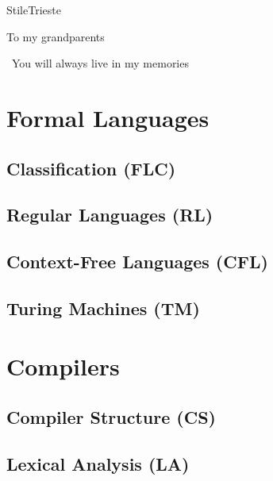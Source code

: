 \documentclass[pdfa,cucitura]{toptesi}
\begin{document}
\english


\expandafter\ifx\csname StileTrieste\endcsname\relax
\else
    \paginavuota
    \begin{dedica}
        To my grandparents

        \textdagger\ You will always live in my memories
    \end{dedica}
    \tomo
\fi

\sommario


\indici

\mainmatter

\part{Formal Languages}

\chapter{Classification (FLC)}


\chapter{Regular Languages (RL)}


\chapter{Context-Free Languages (CFL)}


\chapter{Turing Machines (TM)}

\part{Compilers}

\chapter{Compiler Structure (CS)}


\chapter{Lexical Analysis (LA)}

\end{document}
